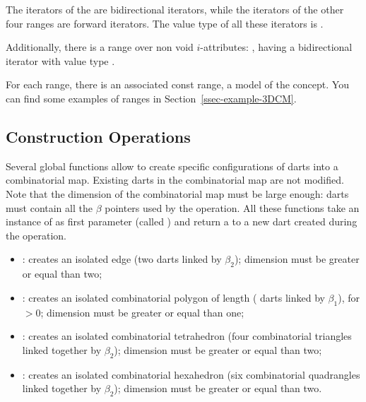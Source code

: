 The iterators of the  are bidirectional iterators, 
while the iterators of the other four ranges are forward iterators. 
The value type of all these iterators is .

Additionally, there is a range over non void $i$-attributes:
, having a bidirectional iterator with
value type .

For each range, there is an associated const range, a model of the
 concept.  You can find some examples of ranges in
Section~\ref{ssec-example-3DCM}.

\subsection{Construction Operations}\label{ssec-construction}

Several global functions allow to create specific configurations of
darts into a combinatorial map. Existing darts in the combinatorial
map are not modified. Note that the dimension of the combinatorial map
must be large enough: darts must contain all the $\beta$ pointers used by the
operation. All these functions take an instance of
 as first parameter (called ) and return
a  to a new dart created during the operation.

\begin{itemize}
\item {}: creates an isolated edge (two darts
  linked by $\beta_2$); dimension must be greater or equal than two;
\item {}: creates an
  isolated combinatorial polygon of length  ( darts
  linked by $\beta_1$), for $>0$; dimension must be greater
  or equal than one;
\item {}: creates an
  isolated combinatorial tetrahedron (four combinatorial triangles
  linked together by $\beta_2$); dimension must be greater or equal
  than two;
\item {}: creates an
  isolated combinatorial hexahedron (six combinatorial quadrangles
  linked together by $\beta_2$); dimension must be greater or equal
  than two.
\end{itemize}

